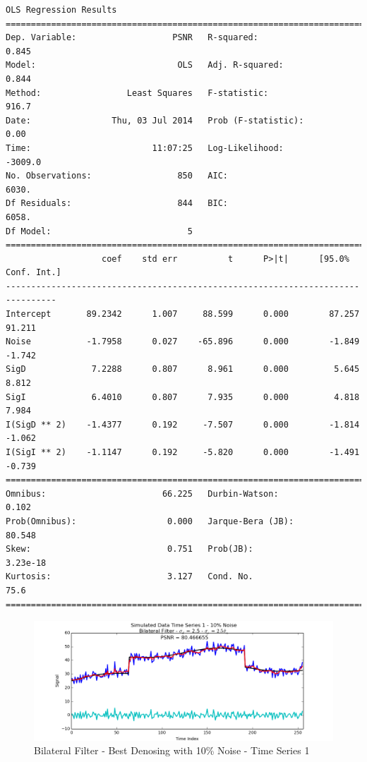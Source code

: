 \documentclass[11pt]{article}
\theoremstyle{definition}
\begin{document}
{\begin{lstlisting}[caption = Time Series 3 - Bilateral Filter OLS Model, label = {bilateralfilterseries3}]
                            OLS Regression Results                            
==============================================================================
Dep. Variable:                   PSNR   R-squared:                       0.845
Model:                            OLS   Adj. R-squared:                  0.844
Method:                 Least Squares   F-statistic:                     916.7
Date:                Thu, 03 Jul 2014   Prob (F-statistic):               0.00
Time:                        11:07:25   Log-Likelihood:                -3009.0
No. Observations:                 850   AIC:                             6030.
Df Residuals:                     844   BIC:                             6058.
Df Model:                           5                                         
================================================================================
                   coef    std err          t      P>|t|      [95.0% Conf. Int.]
--------------------------------------------------------------------------------
Intercept       89.2342      1.007     88.599      0.000        87.257    91.211
Noise           -1.7958      0.027    -65.896      0.000        -1.849    -1.742
SigD             7.2288      0.807      8.961      0.000         5.645     8.812
SigI             6.4010      0.807      7.935      0.000         4.818     7.984
I(SigD ** 2)    -1.4377      0.192     -7.507      0.000        -1.814    -1.062
I(SigI ** 2)    -1.1147      0.192     -5.820      0.000        -1.491    -0.739
==============================================================================
Omnibus:                       66.225   Durbin-Watson:                   0.102
Prob(Omnibus):                  0.000   Jarque-Bera (JB):               80.548
Skew:                           0.751   Prob(JB):                     3.23e-18
Kurtosis:                       3.127   Cond. No.                         75.6
==============================================================================
\end{lstlisting}
}

\begin{figure}
\centering
\includegraphics[width = 0.75 \textwidth]{BilateralSignal1Best.png}
\caption{Bilateral Filter - Best Denosing with 10\% Noise - Time Series 1}
\label{bilateral1best}
\end{figure}
\end{document}
